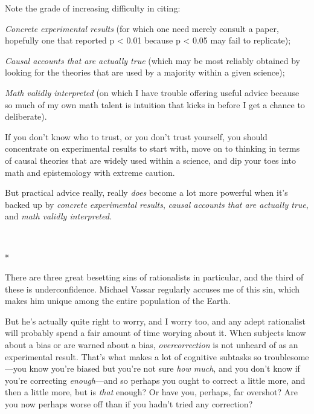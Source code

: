 {
 Note the grade of increasing difficulty in citing:}

{
 \textit{Concrete} \textit{experimental results} (for which one
need merely consult a paper, hopefully one that reported p {\textless}
0.01 because p {\textless} 0.05 may fail to replicate);}

{
 \textit{Causal accounts that are actually true} (which may be most
reliably obtained by looking for the theories that are used by a
majority within a given science);}

{
 \textit{Math validly interpreted} (on which I have trouble
offering useful advice because so much of my own math talent is
intuition that kicks in before I get a chance to deliberate).}

{
 If you don't know who to trust, or you
don't trust yourself, you should concentrate on
experimental results to start with, move on to thinking in terms of
causal theories that are widely used within a science, and dip your
toes into math and epistemology with extreme caution.}

{
 But practical advice really, really \textit{does} become a lot
more powerful when it's backed up by \textit{concrete
experimental results}, \textit{causal accounts that are actually true},
and \textit{math validly interpreted.}}

{\centering
 \ ~
\par}

{\centering
 *
\par}


{
 There are three great besetting sins of rationalists in
particular, and the third of these is underconfidence. Michael Vassar
regularly accuses me of this sin, which makes him unique among the
entire population of the Earth. }

{
 But he's actually quite right to worry, and I
worry too, and any adept rationalist will probably spend a fair amount
of time worying about it. When subjects know about a bias or are warned
about a bias, \textit{overcorrection} is not unheard of as an
experimental result. That's what makes a lot of
cognitive subtasks so troublesome---you know you're
biased but you're not sure \textit{how much}, and you
don't know if you're correcting
\textit{enough}{}---and so perhaps you ought to correct a little more,
and then a little more, but is \textit{that} enough? Or have you,
perhaps, far overshot? Are you now perhaps worse off than if you
hadn't tried any correction?}

